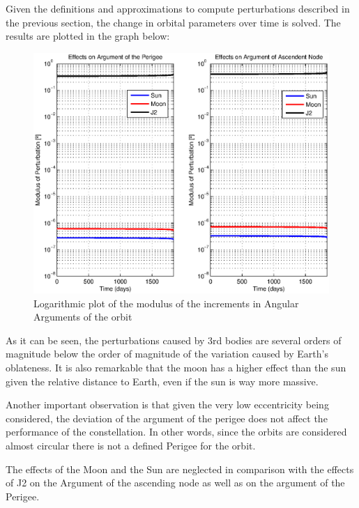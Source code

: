 Given the definitions and approximations to compute perturbations described in the previous section, the change in orbital parameters over time is solved. The results are plotted in the graph below:

\begin{figure}[H]
\centering
\includegraphics[scale=0.7]{SignificativePerturbations/ModulusAngulars.eps}
\caption[Modulus of the increments in Angular Arguments of the orbit]{Logarithmic plot of the modulus of the increments in Angular Arguments of the orbit}
\end{figure}

As it can be seen, the perturbations caused by 3rd bodies are several orders of magnitude below the order of magnitude of the variation caused by Earth's oblateness. It is also remarkable that the moon has a higher effect than the sun given the relative distance to Earth, even if the sun is way more massive.

Another important observation is that given the very low eccentricity being considered, the deviation of the argument of the perigee does not affect the performance of the constellation. In other words, since the orbits are considered almost circular there is not a defined Perigee for the orbit.

The effects of the Moon and the Sun are neglected in comparison with the effects of J2 on the Argument of the ascending node as well as on the argument of the Perigee.